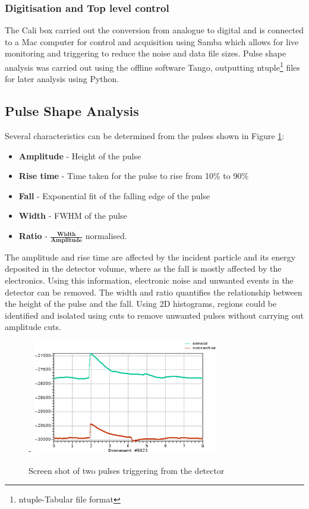 \documentclass[a4paper]{article}
\begin{document}
\subsubsection{Digitisation and Top level control}
The Cali box carried out the conversion from analogue to digital and is connected to a Mac computer for control and acquisition using Samba which allows for live monitoring and triggering to reduce the noise and data file sizes. Pulse shape analysis was carried out using the offline software Tango, outputting ntuple\footnote{ntuple-Tabular file format} files for later analysis using Python.
\subsection{Pulse Shape Analysis} \label{pulse}
Several characteristics can be determined from the pulses shown in Figure \ref{fig:peak}:
\begin{itemize}
    \item {\textbf{Amplitude} - Height of the pulse}
    \item {\textbf{Rise time} - Time taken for the pulse to rise from 10\% to 90\%}
    \item {\textbf{Fall} - Exponential fit of the falling edge of the pulse}
    \item {\textbf{Width} - FWHM of the pulse}
    \item {\textbf{Ratio} - $\frac{\textbf{Width}}{\textbf{Amplitude}}$} normalised.
\end{itemize}
\noindent The amplitude and rise time are affected by the incident particle and its energy deposited in the detector volume, where as the fall is mostly affected by the electronics. Using this information, electronic noise and unwanted events in the detector can be removed. The width and ratio quantifies the relationship between the height of the pulse and the fall.
\newline Using 2D histograms, regions could be identified and isolated using cuts to remove unwanted pulses without carrying out amplitude cuts. 
\begin{figure}[H]-
    \centering
    \includegraphics[height=5cm]{plots/peak.png}
    \caption{Screen shot of two pulses triggering from the detector}
    \label{fig:peak}
\end{figure}
\end{document}
